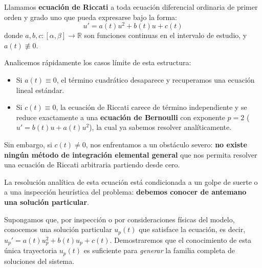 \begin{definición}
    Llamamos \textbf{ecuación de Riccati} a toda ecuación diferencial ordinaria de primer orden y grado uno que pueda expresarse bajo la forma:
    \[
        u' = a(t) u^2 + b(t) u + c(t)
    \]
    donde $a, b, c : [\alpha, \beta] \to \mathbb{R}$ son funciones continuas en el intervalo de estudio, y $a(t) \not\equiv 0$.
\end{definición}

Analicemos rápidamente los casos límite de esta estructura:
\begin{itemize}
    \item Si $a(t) \equiv 0$, el término cuadrático desaparece y recuperamos una ecuación lineal estándar.
    \item Si $c(t) \equiv 0$, la ecuación de Riccati carece de término independiente y se reduce exactamente a una \textbf{ecuación de Bernoulli} con exponente $p = 2$ ($u' = b(t)u + a(t)u^2$), la cual ya sabemos resolver analíticamente.
\end{itemize}

Sin embargo, si $c(t) \neq 0$, nos enfrentamos a un obstáculo severo: \textbf{no existe ningún método de integración elemental general} que nos permita resolver una ecuación de Riccati arbitraria partiendo desde cero. 

La resolución analítica de esta ecuación está condicionada a un golpe de suerte o a una inspección heurística del problema: \textbf{debemos conocer de antemano una solución particular}. 

Supongamos que, por inspección o por consideraciones físicas del modelo, conocemos una solución particular $u_p(t)$ que satisface la ecuación, es decir, $u_p' = a(t)u_p^2 + b(t)u_p + c(t)$. Demostraremos que el conocimiento de esta única trayectoria $u_p(t)$ es suficiente para \textit{generar} la familia completa de soluciones del sistema.

